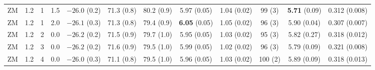 \documentclass[aip,jcp,a4paper,preprint,unsortedaddress,onecolumn,fleqn]{revtex4-1}
\begin{document}
\begin{sidewaystable}
\begin{tabular*}{0.99\textwidth}{@{\extracolsep{\fill}}cccc cccccccc}
    ZM          &1.2 & 1  &1.5 & $-26.0$ (0.2) & 71.3 (0.8)  &80.2 (0.9)           & 5.97 (0.05)               &1.04 (0.02)          & 99 (3)          & \textbf{5.71} (0.09)&        {0.312} (0.008)\\ 
    ZM          &1.2 & 1  &2.0 & $-26.1$ (0.3) & 71.3 (0.8)  &79.4 (0.9)           & \textbf{6.05} (0.05)      &1.05 (0.02)          & 96 (3)          &        {5.90} (0.04)&        {0.307} (0.007)\\\hline
    ZM          &1.2 & 2  &0.0 & $-26.2$ (0.2) & 71.5 (0.9)  &79.7 (1.0)           & 5.95 (0.05)               &1.03 (0.02)          & 95 (3)          &         5.82  (0.27)&         0.318  (0.012)\\
    ZM          &1.2 & 3  &0.0 & $-26.2$ (0.2) & 71.6 (0.9)  &79.5 (1.0)           & 5.99 (0.05)               &1.02 (0.02)          & 96 (3)          &         5.79  (0.09)&         0.321  (0.008)\\
    ZM          &1.2 & 4  &0.0 & $-26.0$ (0.3) & 71.1 (0.8)  &79.5 (1.0)           & 5.96 (0.05)               &1.03 (0.02)          &100 (2)          &         5.89  (0.09)&         0.318  (0.013)\\
    \hline\hline
  \end{tabular*}
  \label{tab:tmp3}
\end{sidewaystable}
\end{document}
